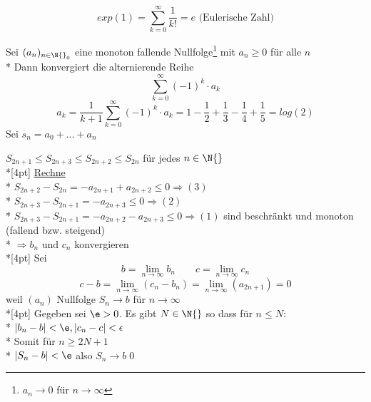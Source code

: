 $$exp(1) = \sum\limits_{k=0}^{\infty} \frac{1}{k!} = e\text{ (Eulerische Zahl)}$$

Sei $(a_n)_{n \in \N{}_0}$ eine monoton fallende Nullfolge\footnote{$a_n → 0$ für $n→∞$} mit $a_n \geq 0$ für alle $n$\\*
Dann konvergiert die alternierende Reihe
$$\sum_{k=0}^{\infty} (-1)^k · a_k$$
\bsp
$$a_k = \frac{1}{k + 1} \sum_{k=0}^{\infty} (-1)^k · a_k = 1 - \frac{1}{2} + \frac{1}{3} - \frac{1}{4} + \frac{1}{5}= log(2)$$
\bew
Sei $s_n = a_0 + ... + a_n$

$S_{2n + 1} \leq S_{2n + 3} \leq S_{2n + 2} \leq S_{2n}$ für jedes $n \in \N{}$\\*[4pt]
\ul{Rechne}\\*
$S_{2n + 2} - S_{2n} = - a_{2n + 1} + a_{2n + 2} \leq 0 \Rightarrow (3)$\\*
$S_{2n + 3} - S_{2n + 1} = - a_{2n + 3} \leq 0 \Rightarrow (2)$\\*
$S_{2n + 3} - S_{2n + 1} = - a_{2n + 2} - a_{2n + 3} \leq 0 \Rightarrow (1)$
sind beschränkt und monoton (fallend bzw. steigend)\\*
$\Rightarrow b_n \text{ und } c_n$ konvergieren\\*[4pt]
Sei $$b = \lim_{n \to \infty} b_n \qquad c = \lim_{n \to \infty} c_n$$
$$c - b = \lim_{n \to \infty} (c_n - b_n) = \lim_{n \to \infty} (a_{2n + 1}) = 0$$
weil $(a_n)$ Nullfolge
$S_n \to b$ für $n \to \infty$\\*[4pt]
Gegeben sei $\e > 0$. Es gibt $N \in \N{}$ so dass für $n \leq N$:\\*
$|b_n - b| < \e, |c_n - c| < \epsilon$\\*
Somit für $n \geq 2N+1 $\\*
$|S_n - b| < \e$ also $S_n \to b$\qed